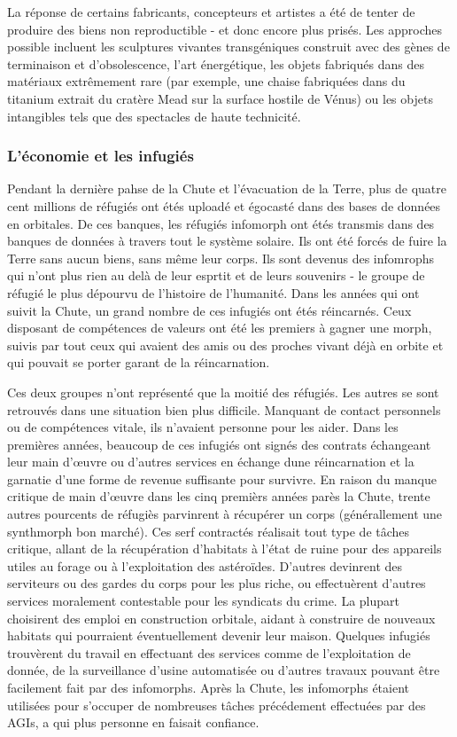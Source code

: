 La réponse de certains fabricants, concepteurs et artistes a été de tenter de produire des biens non reproductible - et donc encore plus prisés. Les approches possible incluent les sculptures vivantes transgéniques construit avec des gènes de terminaison et d'obsolescence, l'art énergétique, les objets fabriqués dans des matériaux extrêmement rare (par exemple, une chaise fabriquées dans du titanium extrait du cratère Mead sur la surface hostile de Vénus) ou les objets intangibles tels que des spectacles de haute technicité. 

\subsubsection{L'économie et les infugiés} \label{sec:econ-infom-refug} 

Pendant la dernière pahse de la Chute et l'évacuation de la Terre, plus de quatre cent millions de réfugiés ont étés uploadé et égocasté dans des bases de données en orbitales. De ces banques, les réfugiés infomorph ont étés transmis dans des banques de données à travers tout le système solaire. Ils ont été forcés de fuire la Terre sans aucun biens, sans même leur corps. Ils sont devenus des infomrophs qui n'ont plus rien au delà de leur esprtit et de leurs souvenirs - le groupe de réfugié le plus dépourvu de l'histoire de l'humanité. Dans les années qui ont suivit la Chute, un grand nombre de ces infugiés ont étés réincarnés. Ceux disposant de compétences de valeurs ont été les premiers à gagner une morph, suivis par tout ceux qui avaient des amis ou des proches vivant déjà en orbite et qui pouvait se porter garant de la réincarnation. 

Ces deux groupes n'ont représenté que la moitié des réfugiés. Les autres se sont retrouvés dans une situation bien plus difficile. Manquant de contact personnels ou de compétences vitale, ils n'avaient personne pour les aider. Dans les premières années, beaucoup de ces infugiés ont signés des contrats échangeant leur main  d'œuvre ou d'autres services en échange dune réincarnation et la garnatie d'une forme de revenue suffisante pour survivre. En raison du manque critique de main d'œuvre dans les cinq premièrs années parès la Chute, trente autres pourcents de réfugiès parvinrent à récupérer un corps (générallement une synthmorph bon marché). Ces serf contractés réalisait tout type de tâches critique, allant de la récupération d'habitats à l'état de ruine pour des appareils utiles au forage ou à l'exploitation des astéroïdes. D'autres devinrent des serviteurs ou des gardes du corps pour les plus riche, ou effectuèrent d'autres services moralement contestable pour les syndicats du crime. La plupart choisirent des emploi en construction orbitale, aidant à construire de nouveaux habitats qui pourraient éventuellement devenir leur maison. Quelques infugiés trouvèrent du travail en effectuant des services comme de l'exploitation de donnée, de la surveillance d'usine automatisée ou d'autres travaux pouvant être facilement fait par des infomorphs. Après la Chute, les infomorphs étaient utilisées pour s'occuper de nombreuses tâches précédement effectuées par des AGIs, a qui plus personne en faisait confiance. 

